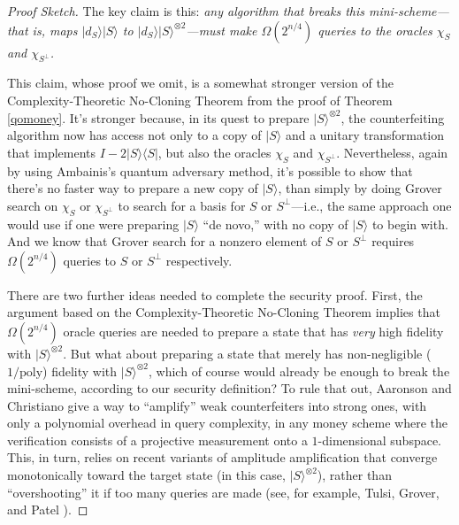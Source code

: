 \documentclass[11pt]{report}
\theoremstyle{plain}
\theoremstyle{definition}
\renewcommand{\bra}[1]{\langle#1|}
\renewcommand{\ket}[1]{|#1\rangle}
\begin{document}
\begin{proof}[Proof Sketch]
The key claim is this: {\em any algorithm that breaks this mini-scheme---that is, maps $\ket{d_S}\ket S$ to $\ket{d_S}{\ket S}^{\otimes 2}$---must make $\Omega(2^{n/4})$ queries to the oracles $\chi_S$ and $\chi_{S^\perp}$.}

This claim, whose proof we omit, is a somewhat stronger version of the Complexity-Theoretic No-Cloning Theorem from the proof of Theorem \ref{qomoney}.  It's stronger because, in its quest to prepare $\ket{S}^{\otimes 2}$, the counterfeiting algorithm now has access not only to a copy of $\ket{S}$ and a unitary transformation that implements $I-2\ket{S}\bra{S}$, but also the oracles $\chi_S$ and $\chi_{S^\perp}$.  Nevertheless, again by using Ambainis's quantum adversary method, it's possible to show that there's no faster way to prepare a new copy of $\ket{S}$, than simply by doing Grover search on $\chi_S$ or $\chi_{S^\perp}$ to search for a basis for $S$ or $S^\perp$---i.e., the same approach one would use if one were preparing $\ket{S}$ ``de novo,'' with no copy of $\ket{S}$ to begin with.  And we know that Grover search for a nonzero element of $S$ or $S^\perp$ requires $\Omega(2^{n/4})$ queries to $S$ or $S^\perp$ respectively.

There are two further ideas needed to complete the security proof.  First, the argument based on the Complexity-Theoretic No-Cloning Theorem implies that $\Omega(2^{n/4})$ oracle queries are needed to prepare a state that has {\em very} high fidelity with $\ket{S}^{\otimes 2}$.  But what about preparing a state that merely has non-negligible ($1/\text{poly}$) fidelity with $\ket{S}^{\otimes 2}$, which of course would already be enough to break the mini-scheme, according to our security definition?  To rule that out, Aaronson and Christiano give a way to ``amplify'' weak counterfeiters into strong ones, with only a polynomial overhead in query complexity, in any money scheme where the verification consists of a projective measurement onto a $1$-dimensional subspace.  This, in turn, relies on recent variants of amplitude amplification that converge monotonically toward the target state (in this case, $\ket{S}^{\otimes 2}$), rather than ``overshooting'' it if too many queries are made (see, for example, Tulsi, Grover, and Patel \cite{tgp}).


\end{proof}
\end{document}
